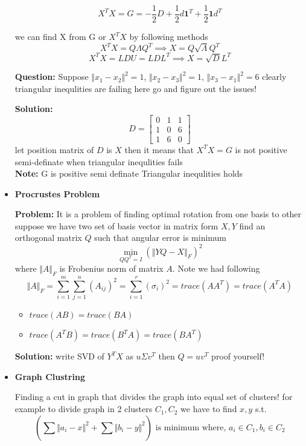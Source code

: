 \documentclass[a4paper]{article}
\numberwithin{equation}{section}
\begin{document}
\begin{itemize}
\[X^TX=G=-\frac{1}{2}D+\frac{1}{2}d\textbf{1}^T+\frac{1}{2}\textbf{1}d^T\]

we can find X from G or $X^TX$ by following methods
\[X^TX=Q\varLambda Q^T \implies X=Q\sqrt{\varLambda}Q^T \tag*{Singular Value Decomposition}\]
\[X^TX=LDU=LDL^T \implies X=\sqrt{D}L^T \tag*{Cholesky Factorisation}\]

\textbf{Question:} Suppose $\Vert x_1-x_2\Vert^2=1$, $\Vert x_2-x_3\Vert^2=1$, $\Vert x_3-x_1\Vert^2=6$ clearly triangular inequlities are failing here go and figure out the issues!

\textbf{Solution:} 
\[D=\begin{bmatrix}
    0&1&1\\1&0&6\\1&6&0
\end{bmatrix}\]
let position matrix of $D$ is $X$ then it means that $X^TX=G$ is not positive semi-definate when triangular inequlities fails\\

\textbf{Note:} G is positive semi definate  Triangular inequlities holds

\item \textbf{Procrustes Problem}

\textbf{Problem:} It is a problem of finding optimal rotation from one basis to other
suppose we have two set of basis vector in matrix form $X,Y$ find an orthogonal matrix $Q$ such that angular error is minimum
\[\min_{QQ^T=I} \left(\Vert YQ-X \Vert_F\right)^2\]
where $\Vert A\Vert_F$ is Frobenius norm of matrix $A$. Note we had following
\[\Vert A\Vert_F=\sum_{i=1}^{m}\sum_{j=1}^{n}(A_{ij})^2=\sum_{i=1}^{r} (\sigma_i)^2=trace(AA^T)=trace(A^TA)\]
\begin{itemize}
    \item $trace(AB)=trace(BA)$
    \item $trace(A^TB)=trace(B^TA)=trace(BA^T)$
\end{itemize}

\textbf{Solution:}
write SVD of $Y^TX$ as $u\Sigma v^T$ then $Q=uv^T$ proof yourself!

\item \textbf{Graph Clustring}

Finding a cut in graph that divides the graph into equal set of clusters!
for example to divide graph in 2 clusters $C_1,C_2$ we have to find $x,y$ s.t.
\[\left(\sum_{}^{}\Vert a_i-x\Vert^2+\sum_{}^{}\Vert b_i-y\Vert^2 \right) \text{ is minimum where, }a_i\in C_1,b_i\in C_2\]


\end{itemize}
\end{document}
